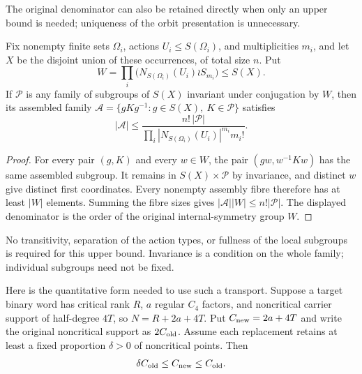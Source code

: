 The original denominator can also be retained directly when only an
upper bound is needed; uniqueness of the orbit presentation is unnecessary.

\begin{lemma}\label{lem:upper-assembly}
Fix nonempty finite sets $\Omega_i$, actions $U_i\leq S(\Omega_i)$,
and multiplicities $m_i$, and let $X$ be the disjoint union of these
occurrences, of total size $n$. Put
\[
 W=\prod_i\bigl(N_{S(\Omega_i)}(U_i)\wr S_{m_i}\bigr)\leq S(X).
\]
If $\mathcal P$ is any family of subgroups of $S(X)$ invariant under
conjugation by $W$, then its assembled family
$\mathcal A=\{gKg^{-1}:g\in S(X),\ K\in\mathcal P\}$ satisfies
\[
 |\mathcal A|\leq
 \frac{n!\,|\mathcal P|}
 {\prod_i |N_{S(\Omega_i)}(U_i)|^{m_i}m_i!}.
\]
\end{lemma}
\begin{proof}
For every pair $(g,K)$ and every $w\in W$, the pair
$(gw,w^{-1}Kw)$ has the same assembled subgroup. It remains in
$S(X)\times\mathcal P$ by invariance, and distinct $w$ give distinct
first coordinates. Every nonempty assembly fibre therefore has at
least $|W|$ elements. Summing the fibre sizes gives
$|\mathcal A||W|\leq n!|\mathcal P|$. The displayed denominator is
the order of the original internal-symmetry group $W$.
\end{proof}

No transitivity, separation of the action types, or fullness of the
local subgroups is required for this upper bound. Invariance is a
condition on the whole family; individual subgroups need not be fixed.

Here is the quantitative form needed to use such a transport. Suppose
a target binary word has critical rank $R$, $a$ regular $C_4$ factors,
and noncritical carrier support of half-degree $4T$, so
$N=R+2a+4T$. Put $C_{\rm new}=2a+4T$ and write the original
noncritical support as $2C_{\rm old}$. Assume each replacement retains
at least a fixed proportion $\delta>0$ of noncritical points. Then
\begin{equation}\label{eq:support-transport}
 \delta C_{\rm old}\leq C_{\rm new}\leq C_{\rm old}.
\end{equation}


